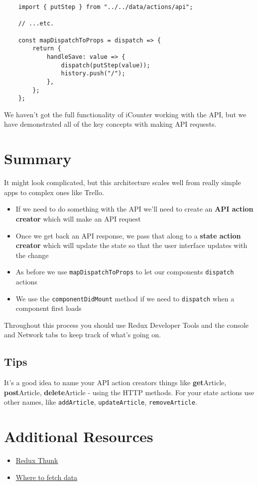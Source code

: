 \begin{verbatim}
    import { putStep } from "../../data/actions/api";

    // ...etc.

    const mapDispatchToProps = dispatch => {
        return {
            handleSave: value => {
                dispatch(putStep(value));
                history.push("/");
            },
        };
    };
\end{verbatim}


\hr

We haven't got the full functionality of iCounter working with the API, but we have demonstrated all of the key concepts with making API requests.


\section{Summary}

It might look complicated, but this architecture scales well from really simple apps to complex ones like Trello.


\begin{itemize}
    \item If we need to do something with the API we'll need to create an \textbf{API action creator} which will make an API request
    \item Once we get back an API response, we pass that along to a \textbf{state action creator} which will update the state so that the user interface updates with the change
    \item As before we use \texttt{mapDispatchToProps} to let our components \texttt{dispatch} actions
    \item We use the \texttt{componentDidMount} method if we need to \texttt{dispatch} when a component first loads
\end{itemize}

Throughout this process you should use Redux Developer Tools and the console and Network tabs to keep track of what's going on.

\subsection{Tips}

It's a good idea to name your API action creators things like \textbf{get}Article, \textbf{post}Article, \textbf{delete}Article - using the HTTP methods. For your state actions use other names, like \texttt{addArticle}, \texttt{updateArticle}, \texttt{removeArticle}.






\section{Additional Resources}

\begin{itemize}[leftmargin=*]
    \item \href{https://github.com/gaearon/redux-thunk}{Redux Thunk}
    \item \href{https://daveceddia.com/where-fetch-data-componentwillmount-vs-componentdidmount/}{Where to fetch data}
\end{itemize}

